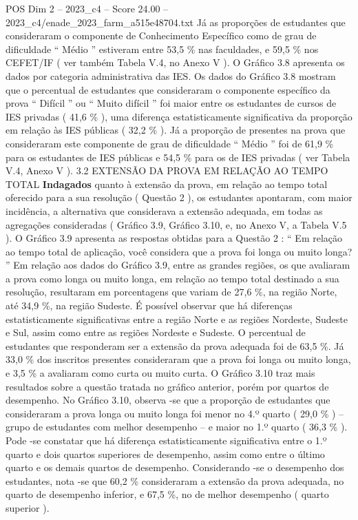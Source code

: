 \begin{textsample}{POS Dim 2 – 2023\_c4 – Score 24.00 – 2023\_c4/enade\_2023\_farm\_a515e48704.txt}
Já as proporções de estudantes que consideraram o componente de Conhecimento Específico como de grau de dificuldade “ Médio ” estiveram entre 53,5 \% nas faculdades, e 59,5 \% nos CEFET/IF ( ver também Tabela V.4, no Anexo V ).
O Gráfico 3.8 apresenta os dados por categoria administrativa das IES.
Os dados do Gráfico 3.8 mostram que o percentual de estudantes que consideraram o componente específico da prova “ Difícil ” ou “ Muito difícil ” foi maior entre os estudantes de cursos de IES privadas ( 41,6 \% ), uma diferença estatisticamente significativa da proporção em relação às IES públicas ( 32,2 \% ).
Já a proporção de presentes na prova que consideraram este componente de grau de dificuldade “ Médio ” foi de 61,9 \% para os estudantes de IES públicas e 54,5 \% para os de IES privadas ( ver Tabela V.4, Anexo V ). 3.2 EXTENSÃO DA PROVA EM RELAÇÃO AO TEMPO TOTAL \textbf{Indagados} quanto à extensão da prova, em relação ao tempo total oferecido para a sua resolução ( Questão 2 ), os estudantes apontaram, com maior incidência, a alternativa que considerava a extensão adequada, em todas as agregações consideradas ( Gráfico 3.9, Gráfico 3.10, e, no Anexo V, a Tabela V.5 ).
O Gráfico 3.9 apresenta as respostas obtidas para a Questão 2 : “ Em relação ao tempo total de aplicação, você considera que a prova foi longa ou muito longa? ” Em relação aos dados do Gráfico 3.9, entre as grandes regiões, os que avaliaram a prova como longa ou muito longa, em relação ao tempo total destinado a sua resolução, resultaram em porcentagens que variam de 27,6 \%, na região Norte, até 34,9 \%, na região Sudeste.
É possível observar que há diferenças estatisticamente significativas entre a região Norte e as regiões Nordeste, Sudeste e Sul, assim como entre as regiões Nordeste e Sudeste.
O percentual de estudantes que responderam ser a extensão da prova adequada foi de 63,5 \%.
Já 33,0 \% dos inscritos presentes consideraram que a prova foi longa ou muito longa, e 3,5 \% a avaliaram como curta ou muito curta.
O Gráfico 3.10 traz mais resultados sobre a questão tratada no gráfico anterior, porém por quartos de desempenho.
No Gráfico 3.10, observa -se que a proporção de estudantes que consideraram a prova longa ou muito longa foi menor no 4.º quarto ( 29,0 \% ) – grupo de estudantes com melhor desempenho – e maior no 1.º quarto ( 36,3 \% ).
Pode -se constatar que há diferença estatisticamente significativa entre o 1.º quarto e dois quartos superiores de desempenho, assim como entre o último quarto e os demais quartos de desempenho.
Considerando -se o desempenho dos estudantes, nota -se que 60,2 \% consideraram a extensão da prova adequada, no quarto de desempenho inferior, e 67,5 \%, no de melhor desempenho ( quarto superior ).

\end{textsample}
